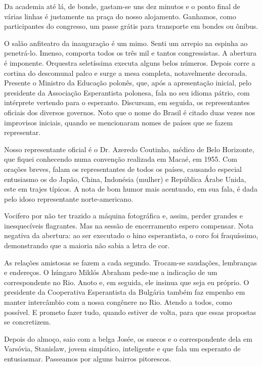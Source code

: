 Da academia até lá, de bonde, gastam-se uns dez minutos e o ponto final de várias linhas é justamente na praça do nosso alojamento. Ganhamos, como participantes do congresso, um passe grátis para transporte em bondes ou ônibus.

O salão anfiteatro da inauguração é um mimo. Senti um arrepio na espinha ao penetrá-lo. Imenso, comporta todos os três mil e tantos congressistas. A abertura é imponente. Orquestra seletíssima executa alguns belos números. Depois corre a cortina do descomunal palco e surge a mesa completa, notavelmente decorada. Presente o Ministro da Educação polonês, que, após a apresentação inicial, pelo presidente da Associação Esperantista polonesa, fala no seu idioma pátrio, com intérprete vertendo para o esperanto. Discursam, em seguida, os representantes oficiais dos diversos governos. Noto que o nome do Brasil é citado duas vezes nos improvisos iniciais, quando se mencionaram nomes de países que se fazem representar.

Nosso representante oficial é o Dr. Azeredo Coutinho, médico de Belo Horizonte, que fiquei conhecendo numa convenção realizada em Macaé, em 1955. Com orações breves, falam os representantes de todos os países, causando especial entusiasmo os do Japão, China, Indonésia (mulher) e República Árabe Unida, este em trajes típicos. A nota de bom humor mais acentuado, em sua fala, é dada pelo idoso representante norte-americano.

Vocifero por não ter trazido a máquina fotográfica e, assim, perder grandes e inesquecíveis flagrantes. Mas na sessão de encerramento espero compensar. Nota negativa da abertura: ao ser executado o hino esperantista, o coro foi fraquíssimo, demonstrando que a maioria não sabia a letra de cor.

As relações amistosas se fazem a cada segundo. Trocam-se saudações, lembranças e endereços. O húngaro Miklós Abraham pede-me a indicação de um correspondente no Rio. Anoto e, em seguida, ele insinua que seja eu próprio. O presidente da Cooperativa Esperantista da Bulgária também faz empenho em manter intercâmbio com a nossa congênere no Rio. Atendo a todos, como possível. E prometo fazer tudo, quando estiver de volta, para que essas propostas se concretizem.

Depois do almoço, saio com a belga Josée, os suecos e o correspondente dela em Varsóvia, Stanislaw, jovem simpático, inteligente e que fala um esperanto de entusiasmar. Passeamos por alguns bairros pitorescos.

